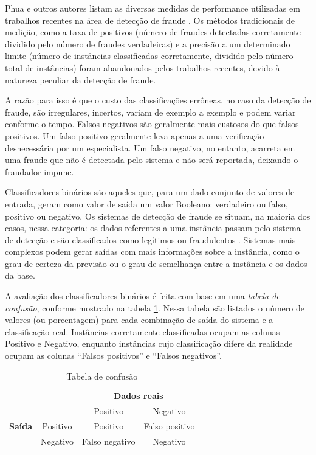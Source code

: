 Phua e outros autores listam as diversas medidas de performance utilizadas em trabalhos recentes na área de detecção de fraude \cite{Phua2010}. Os métodos tradicionais de medição, como a taxa de positivos (número de fraudes detectadas corretamente dividido pelo número de fraudes verdadeiras) e a precisão a um determinado limite (número de instâncias classificadas corretamente, dividido pelo número total de instâncias) foram abandonados pelos trabalhos recentes, devido à natureza peculiar da detecção de fraude.

A razão para isso é que o custo das classificações errôneas, no caso da detecção de fraude, são irregulares, incertos, variam de exemplo a exemplo e podem variar conforme o tempo. Falsos negativos são geralmente mais custosos do que falsos positivos. Um falso positivo geralmente leva apenas a uma verificação desnecessária por um especialista. Um falso negativo, no entanto, acarreta em uma fraude que não é detectada pelo sistema e não será reportada, deixando o fraudador impune.

Classificadores binários são aqueles que, para um dado conjunto de valores de entrada, geram como valor de saída um valor Booleano: verdadeiro ou falso, positivo ou negativo. Os sistemas de detecção de fraude se situam, na maioria dos casos, nessa categoria: os dados referentes a uma instância passam pelo sistema de detecção e são classificados como legítimos ou fraudulentos \cite{Bewick2004}. Sistemas mais complexos podem gerar saídas com mais informações sobre a instância, como o grau de certeza da previsão ou o grau de semelhança entre a instância e os dados da base.

A avaliação dos classificadores binários é feita com base em uma \emph{tabela de confusão}, conforme mostrado na tabela \ref{fraud:confusion}. Nessa tabela são listados o número de valores (ou porcentagem) para cada combinação de saída do sistema e a classificação real. Instâncias corretamente classificadas ocupam as colunas Positivo e Negativo, enquanto instâncias cujo classificação difere da realidade ocupam as colunas ``Falsos positivos'' e ``Falsos negativos''.

\renewcommand{\arraystretch}{1.5}
\vspace{2mm}
\begin{table}[h!]
    \centering
    \begin{tabular}{c l c c}
        & & \multicolumn{2}{c}{\textbf{Dados reais}} \\
        \multirow{3}{5mm}{\begin{sideways}\parbox{20mm}{\textbf{Saída}}\end{sideways}} & \multicolumn{1}{c|}{} & Positivo & Negativo \\
        \cline{2-4}
        & \multicolumn{1}{c|}{Positivo} & Positivo & Falso positivo\\
        & \multicolumn{1}{c|}{Negativo} & Falso negativo & Negativo\\
    \end{tabular}
    \caption{Tabela de confusão}
    \label{fraud:confusion}
\end{table}
\vspace{2mm}

